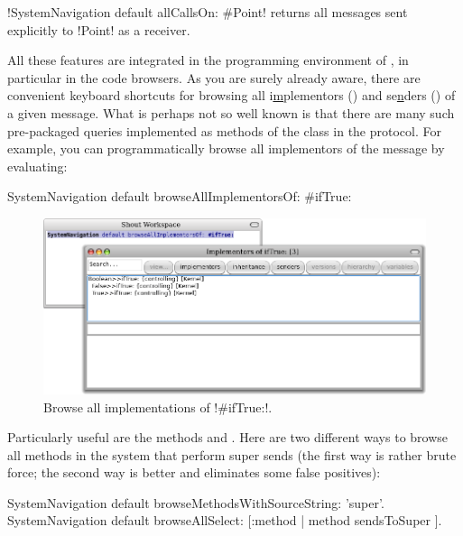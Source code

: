 \documentclass[a4paper,10pt,twoside]{book}
\begin{document}
\ct!SystemNavigation default allCallsOn: #Point! returns all messages sent explicitly to \ct!Point! as a receiver.

All these features are integrated in the programming environment of \pharo, in particular in the code browsers.
As you are surely already aware, there are convenient keyboard shortcuts for browsing all i\underline{m}plementors () and se\underline{n}ders () of a given message.
What is perhaps not so well known is that there are many such pre-packaged queries implemented as methods of the  class in the  protocol.
For example, you can programmatically browse all implementors of the message  by evaluating:
\begin{code}{}
SystemNavigation default browseAllImplementorsOf: #ifTrue:
\end{code}

\begin{figure}[ht]\centering
	\includegraphics[width=\linewidth]{implementors}
	\caption{Browse all implementations of \ct!\#ifTrue:!.}
\end{figure}

Particularly useful are the methods  and .  Here are two different ways to browse all methods in the system that perform super sends (the first way is rather brute force; the second way is better and eliminates some false positives):
\begin{code}{}
SystemNavigation default browseMethodsWithSourceString: 'super'.
SystemNavigation default browseAllSelect: [:method | method sendsToSuper ].
\end{code}
\end{document}
